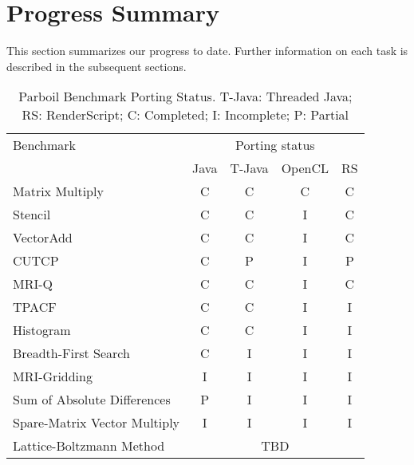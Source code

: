 \section*{Progress Summary}

This section summarizes our progress to date. Further information on each task
is described in the subsequent sections.


\begin{table}[h]\small
\centering
\begin{tabular}{ | l | c | c | c | c |}
    \hline 
    Benchmark & \multicolumn{4}{|c|}{Porting status} \\ \cline{2-5}
              & Java & T-Java & OpenCL & RS \\ \hline
    Matrix Multiply & C & C & C & C \\ \hline
    Stencil & C & C & I & C \\ \hline
    VectorAdd & C & C & I & C \\ \hline
    CUTCP & C & P  & I  & P \\ \hline
    MRI-Q & C & C & I & C \\ \hline
    TPACF & C & C & I & I \\ \hline
    Histogram & C & C & I & I \\ \hline
    Breadth-First Search & C & I & I & I \\ \hline
    MRI-Gridding & I & I & I & I \\ \hline
    Sum of Absolute Differences & P & I & I & I \\ \hline
    Spare-Matrix Vector Multiply & I & I & I & I \\ \hline
    Lattice-Boltzmann Method & \multicolumn{4}{|c|}{TBD} \\ \hline
    \hline
\end{tabular}
\caption{Parboil Benchmark Porting Status. T-Java: Threaded Java; RS:
RenderScript; C: Completed; I: Incomplete; P: Partial}
\label{table:parboil}
\end{table}

